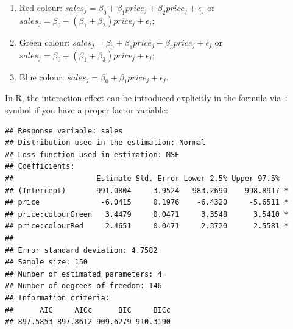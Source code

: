 \documentclass[
]{book}
\newenvironment{Shaded}{\begin{snugshade}}{\end{snugshade}}
\newcommand{\AttributeTok}[1]{\textcolor[rgb]{0.77,0.63,0.00}{#1}}
\newcommand{\CommentTok}[1]{\textcolor[rgb]{0.56,0.35,0.01}{\textit{#1}}}
\newcommand{\DecValTok}[1]{\textcolor[rgb]{0.00,0.00,0.81}{#1}}
\newcommand{\FunctionTok}[1]{\textcolor[rgb]{0.00,0.00,0.00}{#1}}
\newcommand{\NormalTok}[1]{#1}
\newcommand{\OtherTok}[1]{\textcolor[rgb]{0.56,0.35,0.01}{#1}}
\newcommand{\SpecialCharTok}[1]{\textcolor[rgb]{0.00,0.00,0.00}{#1}}
\newcommand{\StringTok}[1]{\textcolor[rgb]{0.31,0.60,0.02}{#1}}
\providecommand{\tightlist}{%
  \setlength{\itemsep}{0pt}\setlength{\parskip}{0pt}}
\theoremstyle{definition}
\theoremstyle{definition}
\theoremstyle{definition}
\theoremstyle{definition}
\theoremstyle{remark}
\begin{document}
\begin{enumerate}
\def\labelenumi{\arabic{enumi}.}
\tightlist
\item
  Red colour: \(sales_j = \beta_0 + \beta_1 price_j + \beta_2 price_j + \epsilon_j\) or \(sales_j = \beta_0 + (\beta_1 + \beta_2) price_j + \epsilon_j\);
\item
  Green colour: \(sales_j = \beta_0 + \beta_1 price_j + \beta_3 price_j + \epsilon_j\) or \(sales_j = \beta_0 + (\beta_1 + \beta_3) price_j + \epsilon_j\);
\item
  Blue colour: \(sales_j = \beta_0 + \beta_1 price_j + \epsilon_j\).
\end{enumerate}

In R, the interaction effect can be introduced explicitly in the formula via \texttt{:} symbol if you have a proper factor variable:

\begin{Shaded}
\end{Shaded}

\begin{verbatim}
## Response variable: sales
## Distribution used in the estimation: Normal
## Loss function used in estimation: MSE
## Coefficients:
##                   Estimate Std. Error Lower 2.5% Upper 97.5%  
## (Intercept)       991.0804     3.9524   983.2690    998.8917 *
## price              -6.0415     0.1976    -6.4320     -5.6511 *
## price:colourGreen   3.4479     0.0471     3.3548      3.5410 *
## price:colourRed     2.4651     0.0471     2.3720      2.5581 *
## 
## Error standard deviation: 4.7582
## Sample size: 150
## Number of estimated parameters: 4
## Number of degrees of freedom: 146
## Information criteria:
##      AIC     AICc      BIC     BICc 
## 897.5853 897.8612 909.6279 910.3190
\end{verbatim}
\end{document}
